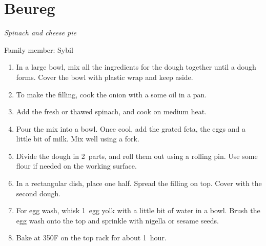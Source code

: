 \chapter{Beureg}
\label{ch:beureg}


\textit{Spinach and cheese pie}

Family member: Sybil

\begin{enumerate}
    \item In a large bowl, mix all the ingredients for the dough together until a dough forms. Cover the bowl with plastic wrap and keep aside.
    \item To make the filling, cook the onion with a some oil in a pan.
    \item Add the fresh or thawed spinach, and cook on medium heat.
    \item Pour the mix into a bowl. Once cool, add the grated feta, the eggs and a little bit of milk. Mix well using a fork.
    \item Divide the dough in 2~parts, and roll them out using a rolling pin. Use some flour if needed on the working surface.
    \item In a rectangular dish, place one half. Spread the filling on top. Cover with the second dough.
    \item For egg wash, whisk 1~egg yolk with a little bit of water in a bowl. Brush the egg wash onto the top and sprinkle with nigella or sesame seeds.
    \item Bake at 350\degree F on the top rack for about 1~hour.
\end{enumerate}

